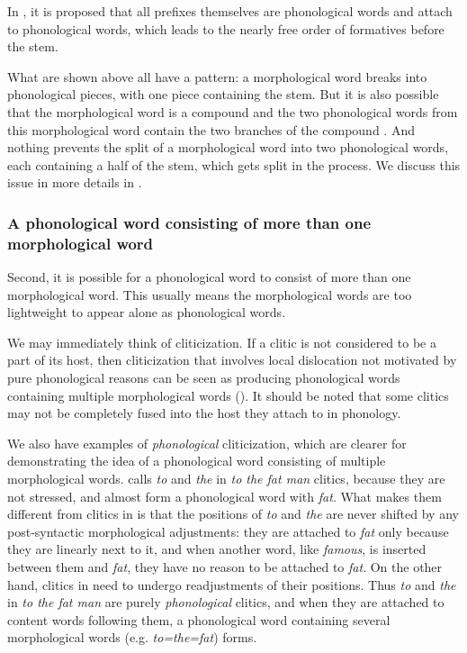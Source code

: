 \documentclass[a4paper, oneside, scheme=plain, 12pt]{article}
\newcommand*{\citepage}[1]{p.~{#1}}
\newcommand{\form}[1]{\emph{#1}}
\begin{document}
In \citet{bickel2007free}, it is proposed that all prefixes themselves are phonological words and attach to phonological words,
which leads to the nearly free order of formatives before the stem.

What are shown above all have a pattern:
a morphological word breaks into phonological pieces,
with one piece containing the stem.
But it is also possible that the morphological word is a compound
and the two phonological words from this morphological word
contain the two branches of the compound  \citep[\citepage{23}]{dixon2010basic2}.
And nothing prevents the split of a morphological word into two phonological words,
each containing a half of the stem, which gets split in the process.
We discuss this issue in more details in .

\subsubsection{A phonological word consisting of more than one morphological word}\label{sec:phonological-multiple-morphological-one-phonological}

Second, it is possible for a phonological word to consist of more than one morphological word.
This usually means the morphological words are too lightweight
to appear alone as phonological words.

We may immediately think of cliticization.
If a clitic is not considered to be a part of its host,
then cliticization that involves local dislocation not motivated by pure phonological reasons
can be seen as producing phonological words containing multiple morphological words
().
It should be noted that some clitics may not be completely fused into the host they attach to in phonology.

We also have examples of \emph{phonological} cliticization,
which are clearer for demonstrating the idea of a phonological word consisting of multiple morphological words.
\citet[\citepage{49}]{dixon2009basic1} calls \form{to} and \form{the} in \form{to the fat man} clitics,
because they are not stressed, and almost form a phonological word with \form{fat}.
What makes them different from clitics in 
is that the positions of \form{to} and \form{the} are never shifted by any post-syntactic morphological adjustments:
they are attached to \form{fat} only because they are linearly next to it,
and when another word, like \form{famous}, is inserted between them and \form{fat},
they have no reason to be attached to \form{fat}.
On the other hand, clitics in  need to undergo readjustments of their positions.
Thus \form{to} and \form{the} in \form{to the fat man} are purely \emph{phonological} clitics,
and when they are attached to content words following them,
a phonological word containing several morphological words (e.g. \form{to=the=fat}) forms.
\end{document}
